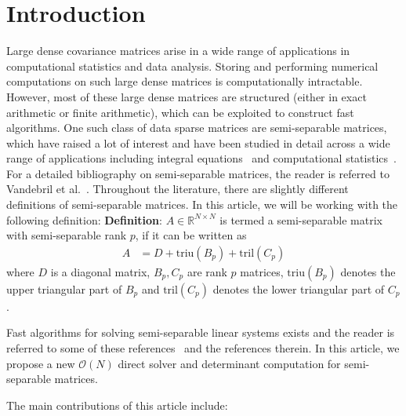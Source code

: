 \documentclass[times]{nlaauth}
\begin{document}
\section{Introduction}
Large dense covariance matrices arise in a wide range of applications in computational statistics and data analysis. Storing and performing numerical computations on such large dense matrices is computationally intractable. However, most of these large dense matrices are structured (either in exact arithmetic or finite arithmetic), which can be exploited to construct fast algorithms. One such class of data sparse matrices are semi-separable matrices, which have raised a lot of interest and have been studied in detail across a wide range of applications including integral equations~\cite{asplund1959finite,gohberg1984non,gesztesy2003modified} and computational statistics~\cite{roy1956inverting,roy1960evaluation,mustafi1967inverse,uppuluri1969inverse, greenberg1959matrix}. For a detailed bibliography on semi-separable matrices, the reader is referred to Vandebril et al.~\cite{vandebril2005bibliography}. Throughout the literature, there are slightly different definitions of semi-separable matrices. In this article, we will be working with the following definition:
\textbf{Definition}: 
$A \in \mathbb{R}^{N \times N}$ is termed a semi-separable matrix with semi-separable rank $p$, if it can be written as
\begin{align}
A & = D + \text{triu}(B_p) + \text{tril}(C_p)
\end{align}
where $D$ is a diagonal matrix, $B_p, C_p$ are rank $p$ matrices, $\text{triu}(B_p)$ denotes the upper triangular part of $B_p$ and $\text{tril}(C_p)$ denotes the lower triangular part of $C_p$.


Fast algorithms for solving semi-separable linear systems exists and the reader is referred to some of these references~\cite{eidelman2002modification,van2004two,eidelman1997inversion,gohberg1985linear, jain2010n,chandrasekaran2003fast} and the references therein. In this article, we propose a new $\mathcal{O}(N)$ direct solver and determinant computation for semi-separable matrices.

The main contributions of this article include:
\end{document}
